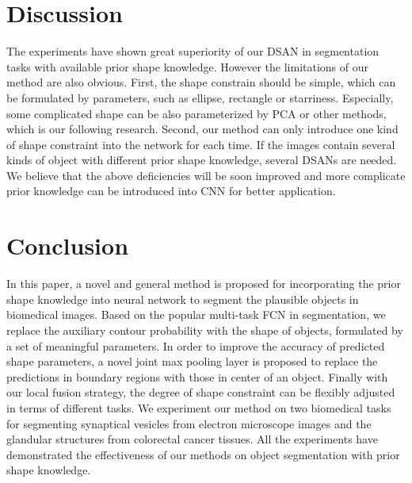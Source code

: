 \documentclass[10pt,twocolumn,letterpaper]{article}
\begin{document}





\section{Discussion}
The experiments have shown great superiority of our DSAN in segmentation tasks with available prior shape knowledge.
However the limitations of our method are also obvious.
First, the shape constrain should be simple, which can be formulated by parameters, such as ellipse, rectangle or starriness.
Especially, some complicated shape can be also parameterized by PCA or other methods, which is our following research.
Second, our method can only introduce one kind of shape constraint into the network for each time.
If the images contain several kinds of object with different prior shape knowledge, several DSANs are needed.
We believe that the above deficiencies will be soon improved and more complicate prior knowledge can be introduced into CNN for better application.

\section{Conclusion}
In this paper, a novel and general method is proposed for incorporating the prior shape knowledge into neural network to segment the plausible objects in biomedical images.
Based on the popular multi-task FCN in segmentation, we replace the auxiliary contour probability with the shape of objects, formulated by a set of meaningful parameters.
In order to improve the accuracy of predicted shape parameters, a novel joint max pooling layer is proposed to replace the predictions in boundary regions with those in center of an object.
Finally with our local fusion strategy, the degree of shape constraint can be flexibly adjusted in terms of different tasks.
We experiment our method on two biomedical tasks for segmenting synaptical vesicles from electron microscope images and the glandular structures from colorectal cancer tissues.
All the experiments have demonstrated the effectiveness of our methods on object segmentation with prior shape knowledge.

{\small


}
\end{document}

